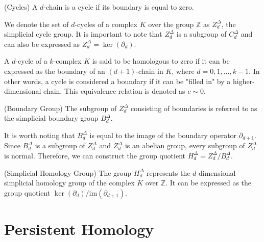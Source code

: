 \begin{definition}{(Cycles) \cite[p.106]{hatcher2005algebraic}}
A $d$-chain is a cycle if its boundary is equal to zero.
\end{definition}

We denote the set of $d$-cycles of a complex $K$ over the group $\mathbb{Z}$ as $Z^\Delta_d$, the simplicial cycle group. It is important to note that $Z^\Delta_d$ is a subgroup of $C^\Delta_d$ and can also be expressed as $Z^\Delta_d = \ker(\partial_d)$.

A $d$-cycle of a $k$-complex $K$ is said to be homologous to zero if it can be expressed as the boundary of an $(d+1)$-chain in $K$, where $d=0,1,\ldots,k-1$. In other words, a cycle is considered a boundary if it can be "filled in" by a higher-dimensional chain. This equivalence relation is denoted as $c \sim 0$.

\begin{definition}{(Boundary Group) \cite[§2.3]{zomorodian2004computing}}
The subgroup of $Z^\Delta_d$ consisting of boundaries is referred to as the simplicial boundary group $B^\Delta_d$.
\end{definition}

It is worth noting that $B^\Delta_d$ is equal to the image of the boundary operator $\partial_{d+1}$. Since $B^\Delta_d$ is a subgroup of $Z^\Delta_d$ and $Z^\Delta_d$ is an abelian group, every subgroup of $Z^\Delta_d$ is normal. Therefore, we can construct the group quotient $H^\Delta_d = Z^\Delta_d / B^\Delta_d$.

\begin{definition}{(Simplicial Homology Group) \cite[§2.1]{hatcher2005algebraic}}
The group $H^\Delta_d$ represents the $d$-dimensional simplicial homology group of the complex $K$ over $\mathbb{Z}$. It can be expressed as the group quotient $\ker(\partial_d) / \text{im}(\partial_{d+1})$.
\end{definition}

\section{Persistent Homology}

